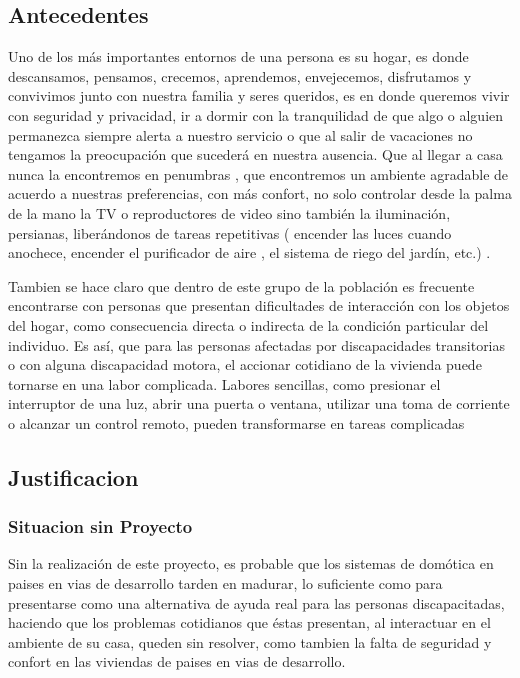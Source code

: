\documentclass[letterpaper,12pt]{article}
\begin{document}
{\subsection{Antecedentes}

Uno de los más importantes entornos de una persona es su hogar, es donde  descansamos,  pensamos, crecemos, aprendemos,  envejecemos, disfrutamos y convivimos  junto con nuestra familia y seres queridos, es en donde queremos  vivir con seguridad y privacidad, ir  a dormir  con la tranquilidad de que algo o alguien permanezca siempre alerta a nuestro servicio o que al  salir de vacaciones no tengamos la preocupación que sucederá en nuestra ausencia.  Que al llegar a casa  nunca la encontremos en penumbras , que  encontremos un ambiente agradable de acuerdo a nuestras preferencias,  con más confort,    no solo controlar desde la palma de la mano la TV o reproductores de video  sino también  la iluminación, persianas, liberándonos de tareas repetitivas ( encender las luces cuando anochece,  encender el  purificador de aire , el sistema de riego del jardín, etc.) .

Tambien se hace claro que dentro de este grupo de la población es frecuente encontrarse con personas que presentan  dificultades de interacción con los objetos del hogar, como consecuencia directa o indirecta de la condición particular del individuo. Es así, que para las personas afectadas por discapacidades transitorias  o  con alguna discapacidad motora, el accionar cotidiano de la vivienda puede tornarse en una labor complicada. Labores sencillas, como presionar el interruptor de una luz, abrir una puerta o ventana, utilizar una toma de corriente o alcanzar un control remoto, pueden transformarse en tareas complicadas 




\subsection{Justificacion}

\subsubsection{Situacion sin Proyecto}

Sin la realización de este proyecto, es probable que los sistemas de domótica  en paises en vias de desarrollo tarden en madurar, lo suficiente como para presentarse como una alternativa de ayuda real para las personas discapacitadas, haciendo que los problemas cotidianos que éstas presentan, al interactuar en el ambiente de su casa, queden sin resolver, como tambien la falta de seguridad y confort en las viviendas de paises en vias de desarrollo.


}
\end{document}
